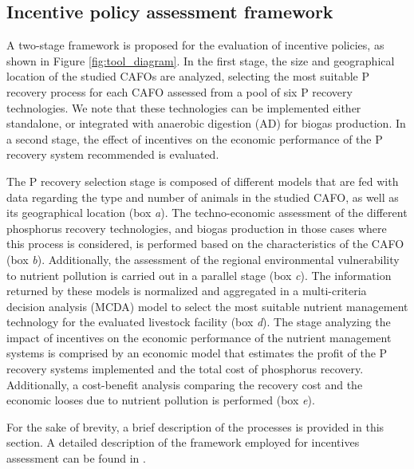 \begin{refsection}[referencesCh5]
\section{Incentive policy assessment framework}

A two-stage framework is proposed for the evaluation of incentive policies, as shown in Figure \ref{fig:tool_diagram}. In the first stage, the size and geographical location of the studied CAFOs are analyzed, selecting the most suitable P recovery process for each CAFO assessed from a pool of six P recovery technologies. We note that these technologies can be implemented either standalone, or integrated with anaerobic digestion (AD) for biogas production. In a second stage, the effect of incentives on the economic performance of the P recovery system recommended is evaluated.

The P recovery selection stage is composed of different models that are fed with data regarding the type and number of animals in the studied CAFO, as well as its geographical location (box \textit{a}).  The techno-economic assessment of the different phosphorus recovery technologies, and biogas production in those cases where this process is considered, is performed based on the characteristics of the CAFO (box \textit{b}). Additionally, the assessment of the regional environmental vulnerability to nutrient pollution is carried out in a parallel stage (box \textit{c}). The information returned by these models is normalized and aggregated in a multi-criteria decision analysis (MCDA) model to select the most suitable nutrient management technology for the evaluated livestock facility (box \textit{d}). The stage analyzing the impact of incentives on the economic performance of the nutrient management systems is comprised by an economic model that estimates the profit of the P recovery systems implemented and the total cost of phosphorus recovery. Additionally, a cost-benefit analysis comparing the recovery cost and the economic looses due to nutrient pollution is performed (box \textit{e}).

For the sake of brevity, a brief description of the processes is provided in this section. A detailed description of the framework employed for incentives assessment can be found in \citet{Tool}.


\end{refsection}
